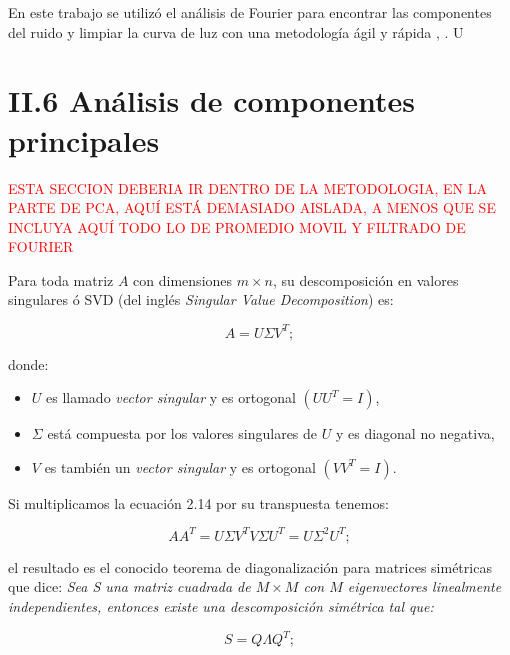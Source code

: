 En este trabajo se utilizó el análisis de Fourier para encontrar las componentes del ruido y limpiar la curva de luz con una metodología ágil y rápida \cite{kosarev1983optimal}, \cite{brault1971analysis}. U

\section*{II.6 Análisis de componentes principales}

\textcolor{red}{ESTA SECCION DEBERIA IR DENTRO DE LA METODOLOGIA, EN LA PARTE DE PCA, AQUÍ ESTÁ DEMASIADO AISLADA, A MENOS QUE SE INCLUYA AQUÍ TODO LO DE PROMEDIO MOVIL Y FILTRADO DE FOURIER}

Para toda matriz $A$ con dimensiones $m\times n$, su descomposición en valores singulares ó SVD (del inglés \textit{Singular Value Decomposition}) es:

\begin{equation}
  \displaystyle A=U\Sigma V^{T};
\end{equation}

\noindent donde:\\

\begin{itemize}
  \item $U$ es llamado \textit{vector singular} y es ortogonal $(UU^{T}=I)$,
  \item $\Sigma$ está compuesta por los valores singulares de $U$ y es diagonal no negativa,
  \item $V$ es también un \textit{vector singular} y es ortogonal $(VV^{T}=I)$.
\end{itemize}

Si multiplicamos la ecuación 2.14 por su transpuesta tenemos:

\begin{equation}
  \displaystyle AA^{T}=U\Sigma V^{T} V\Sigma U^{T} = U \Sigma^{2} U^{T};
\end{equation}

\noindent el resultado es el conocido teorema de diagonalización para matrices simétricas que dice: \textit{Sea S una matriz cuadrada de $M\times M$ con $M$ eigenvectores linealmente independientes, entonces existe una descomposición simétrica tal que:}

\begin{equation*}
  \displaystyle S=Q\Lambda Q^{T};
\end{equation*}


